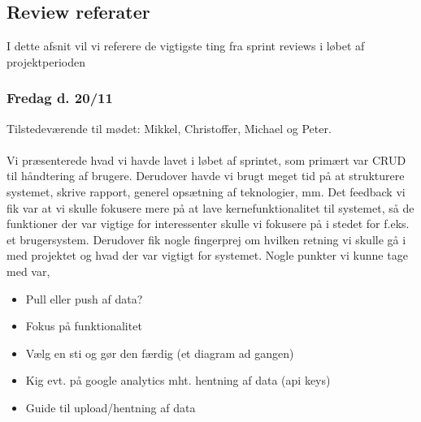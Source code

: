 \subsection{Review referater}
I dette afsnit vil vi referere de vigtigste ting fra sprint reviews i løbet af projektperioden
\subsubsection{Fredag d. 20/11}
Tilstedeværende til mødet: Mikkel, Christoffer, Michael og Peter.
\\\\
Vi præsenterede hvad vi havde lavet i løbet af sprintet, som primært var CRUD til håndtering af brugere. Derudover havde vi brugt meget tid på at strukturere systemet, skrive rapport, generel opsætning af teknologier, mm.
Det feedback vi fik var at vi skulle fokusere mere på at lave kernefunktionalitet til systemet, så de funktioner der var vigtige for interessenter skulle vi fokusere på i stedet for f.eks. et brugersystem.
Derudover fik nogle fingerprej om hvilken retning vi skulle gå i med projektet og hvad der var vigtigt for systemet.
Nogle punkter vi kunne tage med var,
\begin{itemize}
    \item{Pull eller push af data?}
    \item{Fokus på funktionalitet}
    \item{Vælg en sti og gør den færdig (et diagram ad gangen)}
    \item{Kig evt. på google analytics mht. hentning af data (api keys)}
    \item{Guide til upload/hentning af data}
\end{itemize}
